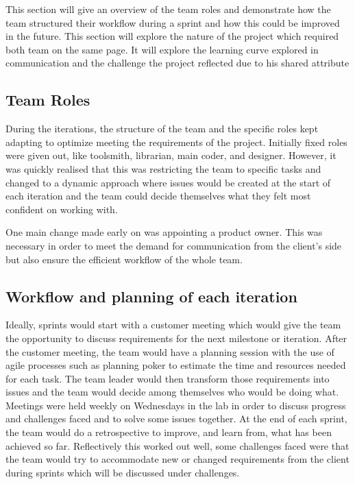 \documentclass{l3proj}
\begin{document}
This section will give an overview of the team roles and demonstrate how the team structured their workflow during a sprint and how this could be improved in the future. 
This section will explore the nature of the project which required both team on the same page. It will explore the learning curve explored in communication and the challenge the project reflected due to his shared attribute 

\subsection{Team Roles}
During the iterations, the structure of the team and the specific roles kept adapting to optimize meeting the requirements of the project. Initially  fixed roles were given out, like toolsmith, librarian, main coder, and designer. \cite{mythical} However, it was quickly realised that this was restricting the team to specific tasks and changed to a dynamic approach where issues would be created at the start of each iteration and the team could decide themselves what they felt most confident on working with. 

One main change made early on was appointing a product owner. This was necessary in order to meet the demand for communication from the client’s side but also ensure the efficient workflow of the whole team.

\subsection{Workflow and planning of each iteration} 
Ideally, sprints would start with a customer meeting which would give the team the opportunity to discuss requirements for the next milestone or iteration. After the customer meeting, the team would have a planning session with the use of agile processes such as planning poker to estimate the time and resources needed for each task. The team leader would then transform those requirements into issues and the team would decide among themselves who would be doing what.  Meetings were held weekly on Wednesdays in the lab in order to discuss progress and challenges faced and to solve some issues together. At the end of each sprint, the team would do a retrospective to improve, and learn from, what has been achieved so far. Reflectively this worked out well, some challenges faced were that the team would try to accommodate new or changed requirements from the client during sprints which will be discussed under challenges. 
\end{document}
